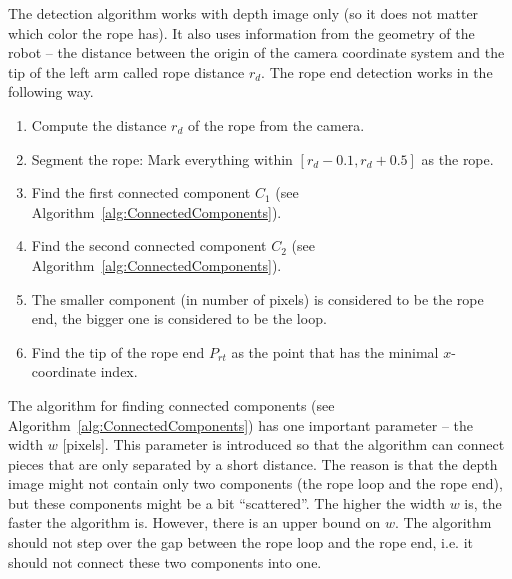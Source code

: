             The detection algorithm works with depth image only (so it does not matter which color the rope has). It also uses information from the geometry of the robot -- the distance between the origin of the camera coordinate system and the tip of the left arm called rope distance $r_d$. The rope end detection works in the following way.
%
            \begin{enumerate}\itemsep0pt
            \label{enu:RopeDetectionAlgorithm}
                \item Compute the distance $r_d$ of the rope from the camera.
                \item Segment the rope: Mark everything within $ [\left. r_{d} - 0.1, r_{d} + 0.5 \right.] $ as the rope.
                \item Find the first connected component $ C_1 $ (see Algorithm~\ref{alg:ConnectedComponents}).
                \item Find the second connected component $ C_2 $ (see Algorithm~\ref{alg:ConnectedComponents}).
                \item The smaller component (in number of pixels) is considered to be the rope end, the bigger one is considered to be the loop.
                \item Find the tip of the rope end $P_{rt}$  as the point that has the minimal $x$-coordinate index.
            \end{enumerate}

            The algorithm for finding connected components (see Algorithm~\ref{alg:ConnectedComponents}) has one important parameter -- the width $w$ [pixels]. This parameter is introduced so that the algorithm can connect pieces that are only separated by a short distance. The reason is that the depth image might not contain only two components (the rope loop and the rope end), but these components might be a bit ``scattered''. The higher the width $w$ is, the faster the algorithm is. However, there is an upper bound on $w$. The algorithm should not step over the gap between the rope loop and the rope end, i.e. it should not connect these two components into one.

